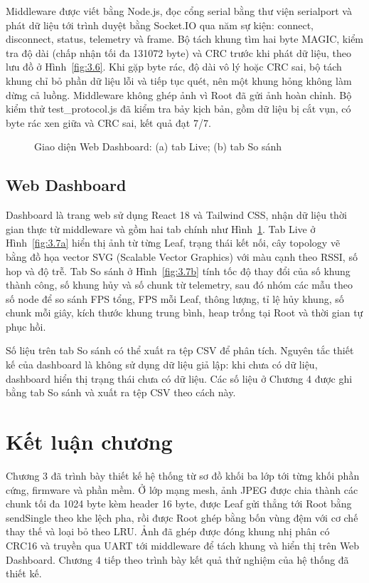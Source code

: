 Middleware được viết bằng Node.js, đọc cổng serial bằng thư viện serialport và phát dữ liệu tới trình duyệt bằng Socket.IO qua năm sự kiện: connect, disconnect, status, telemetry và frame. Bộ tách khung tìm hai byte MAGIC, kiểm tra độ dài (chấp nhận tối đa 131072 byte) và CRC trước khi phát dữ liệu, theo lưu đồ ở Hình~\ref{fig:3.6}. Khi gặp byte rác, độ dài vô lý hoặc CRC sai, bộ tách khung chỉ bỏ phần dữ liệu lỗi và tiếp tục quét, nên một khung hỏng không làm dừng cả luồng. Middleware không ghép ảnh vì Root đã gửi ảnh hoàn chỉnh. Bộ kiểm thử test\_protocol.js đã kiểm tra bảy kịch bản, gồm dữ liệu bị cắt vụn, có byte rác xen giữa và CRC sai, kết quả đạt 7/7.


\begin{figure}[!htbp]\centering
{}

\vspace{6pt}
\caption{Giao diện Web Dashboard: (a) tab Live; (b) tab So sánh}\label{fig:3.7}
\end{figure}


\subsection{Web Dashboard}

Dashboard là trang web sử dụng React 18 và Tailwind CSS, nhận dữ liệu thời gian thực từ middleware và gồm hai tab chính như Hình~\ref{fig:3.7}. Tab Live ở Hình~\ref{fig:3.7a} hiển thị ảnh từ từng Leaf, trạng thái kết nối, cây topology vẽ bằng đồ họa vector SVG (Scalable Vector Graphics) với màu cạnh theo RSSI, số hop và độ trễ. Tab So sánh ở Hình~\ref{fig:3.7b} tính tốc độ thay đổi của số khung thành công, số khung hủy và số chunk từ telemetry, sau đó nhóm các mẫu theo số node để so sánh FPS tổng, FPS mỗi Leaf, thông lượng, tỉ lệ hủy khung, số chunk mỗi giây, kích thước khung trung bình, heap trống tại Root và thời gian tự phục hồi.

Số liệu trên tab So sánh có thể xuất ra tệp CSV để phân tích. Nguyên tắc thiết kế của dashboard là không sử dụng dữ liệu giả lập: khi chưa có dữ liệu, dashboard hiển thị trạng thái chưa có dữ liệu. Các số liệu ở Chương 4 được ghi bằng tab So sánh và xuất ra tệp CSV theo cách này.


\section{Kết luận chương}

Chương 3 đã trình bày thiết kế hệ thống từ sơ đồ khối ba lớp tới từng khối phần cứng, firmware và phần mềm. Ở lớp mạng mesh, ảnh JPEG được chia thành các chunk tối đa 1024 byte kèm header 16 byte, được Leaf gửi thẳng tới Root bằng sendSingle theo khe lệch pha, rồi được Root ghép bằng bốn vùng đệm với cơ chế thay thế và loại bỏ theo LRU. Ảnh đã ghép được đóng khung nhị phân có CRC16 và truyền qua UART tới middleware để tách khung và hiển thị trên Web Dashboard. Chương 4 tiếp theo trình bày kết quả thử nghiệm của hệ thống đã thiết kế.
